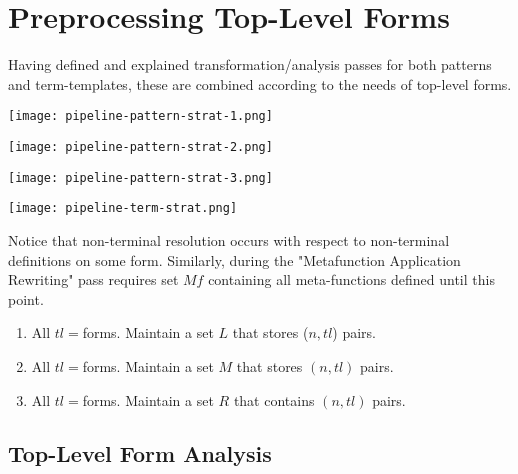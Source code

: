 \section{Preprocessing Top-Level Forms}

Having defined and explained transformation/analysis passes for both patterns and term-templates, these are combined according to the needs of top-level forms.

\texttt{[image: pipeline-pattern-strat-1.png]}

\texttt{[image: pipeline-pattern-strat-2.png]}

\texttt{[image: pipeline-pattern-strat-3.png]}

\texttt{[image: pipeline-term-strat.png]}

Notice that non-terminal resolution occurs with respect to non-terminal definitions on some \DefineLanguageNoArg form. Similarly, during the "Metafunction Application Rewriting" pass requires set $Mf$ containing all meta-functions defined until this point. 

\begin{enumerate}
\item All $tl=$\TlDefineLanguage \space forms. Maintain a set $L$ that stores ($n, tl$) pairs.
\item All $tl=$\TlDefineMetafunction \space forms. Maintain a set $M$ that stores $(n, tl)$ pairs.
\item All $tl=$\TlDefineReductionRelation \space forms. Maintain a set $R$ that contains $(n, tl)$ pairs.
\end{enumerate}

\subsection{Top-Level Form Analysis}

